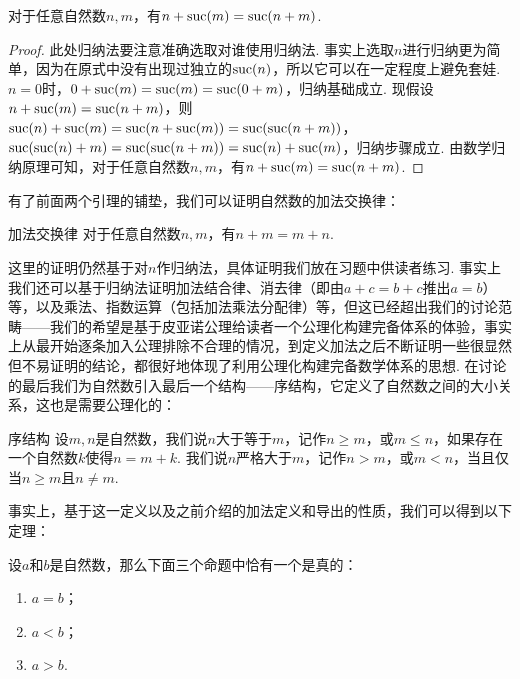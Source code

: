 \begin{lemma}{}{}
    对于任意自然数$n,m$，有$n+\operatorname{suc}(m)=\operatorname{suc}(n+m)$.
\end{lemma}
\begin{proof}
    此处归纳法要注意准确选取对谁使用归纳法. 事实上选取$n$进行归纳更为简单，因为在原式中没有出现过独立的$\operatorname{suc}(n)$，所以它可以在一定程度上避免套娃. $n=0$时，$0+\operatorname{suc}(m)=\operatorname{suc}(m)=\operatorname{suc}(0+m)$，归纳基础成立. 现假设$n+\operatorname{suc}(m)=\operatorname{suc}(n+m)$，则$\operatorname{suc}(n)+\operatorname{suc}(m)=\operatorname{suc}(n+\operatorname{suc}(m))=\operatorname{suc}(\operatorname{suc}(n+m))$，$\operatorname{suc}(\operatorname{suc}(n)+m)=\operatorname{suc}(\operatorname{suc}(n+m))=\operatorname{suc}(n)+\operatorname{suc}(m)$，归纳步骤成立. 由数学归纳原理可知，对于任意自然数$n,m$，有$n+\operatorname{suc}(m)=\operatorname{suc}(n+m)$.
\end{proof}

有了前面两个引理的铺垫，我们可以证明自然数的加法交换律：

\begin{theorem}{加法交换律}{}
    对于任意自然数$n,m$，有$n+m=m+n$.
\end{theorem}
这里的证明仍然基于对$n$作归纳法，具体证明我们放在习题中供读者练习. 事实上我们还可以基于归纳法证明加法结合律、消去律（即由$a+c=b+c$推出$a=b$）等，以及乘法、指数运算（包括加法乘法分配律）等，但这已经超出我们的讨论范畴——我们的希望是基于皮亚诺公理给读者一个公理化构建完备体系的体验，事实上从最开始逐条加入公理排除不合理的情况，到定义加法之后不断证明一些很显然但不易证明的结论，都很好地体现了利用公理化构建完备数学体系的思想. 在讨论的最后我们为自然数引入最后一个结构——序结构，它定义了自然数之间的大小关系，这也是需要公理化的：

\begin{definition}{序结构}{}
    设$m,n$是自然数，我们说$n$大于等于$m$，记作$n\geqslant m$，或$m\leqslant n$，如果存在一个自然数$k$使得$n=m+k$. 我们说$n$严格大于$m$，记作$n>m$，或$m<n$，当且仅当$n\geqslant m$且$n\neq m$.
\end{definition}

事实上，基于这一定义以及之前介绍的加法定义和导出的性质，我们可以得到以下定理：

\begin{theorem}{}{}
    设$a$和$b$是自然数，那么下面三个命题中恰有一个是真的：
    \begin{enumerate}
        \item $a=b$；

        \item $a<b$；

        \item $a>b$.
    \end{enumerate}
\end{theorem}

